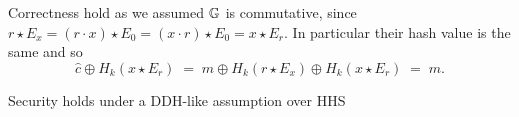 Correctness hold as we assumed $\mathbb{G}$ is commutative, since $r \star E_x = (r \cdot x) \star E_0 = (x \cdot r) \star E_0 = x \star E_r$. 
In particular their hash value is the same and so
\[
	\hat{c} \oplus H_k(x \star E_r)
		\; = \;
	m \oplus H_k(r \star E_x) \oplus H_k(x \star E_r)
		\; = \;
	m.
\]

Security holds under a DDH-like assumption over HHS 